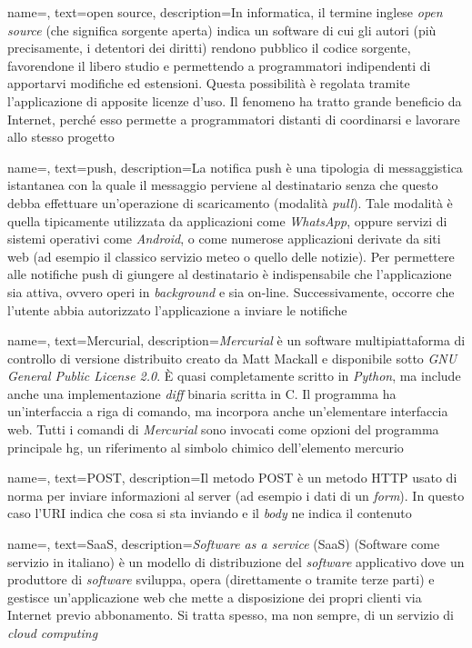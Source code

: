 {
    name=,
    text=open source,
    description={In informatica, il termine inglese \emph{open source} (che significa sorgente aperta) indica un software di cui gli autori (più precisamente, i detentori dei diritti) rendono pubblico il codice sorgente, favorendone il libero studio e permettendo a programmatori indipendenti di apportarvi modifiche ed estensioni. Questa possibilità è regolata tramite l'applicazione di apposite licenze d'uso. Il fenomeno ha tratto grande beneficio da Internet, perché esso permette a programmatori distanti di coordinarsi e lavorare allo stesso progetto}
}

{
    name=,
    text=push,
    description={La notifica push è una tipologia di messaggistica istantanea con la quale il messaggio perviene al destinatario senza che questo debba effettuare un'operazione di scaricamento (modalità \emph{pull}). Tale modalità è quella tipicamente utilizzata da applicazioni come \emph{WhatsApp}, oppure servizi di sistemi operativi come \emph{Android}, o come numerose applicazioni derivate da siti web (ad esempio il classico servizio meteo o quello delle notizie).
Per permettere alle notifiche push di giungere al destinatario è indispensabile che l'applicazione sia attiva, ovvero operi in \emph{background} e sia on-line. Successivamente, occorre che l'utente abbia autorizzato l'applicazione a inviare le notifiche}
}

{
    name=,
    text=Mercurial,
    description={\emph{Mercurial} è un software multipiattaforma di controllo di versione distribuito creato da Matt Mackall e disponibile sotto \emph{GNU General Public License 2.0}.
È quasi completamente scritto in \emph{Python}, ma include anche una implementazione \emph{diff} binaria scritta in C. Il programma ha un'interfaccia a riga di comando, ma incorpora anche un'elementare interfaccia web. 
Tutti i comandi di \emph{Mercurial} sono invocati come opzioni del programma principale hg, un riferimento al simbolo chimico dell'elemento mercurio}
}

{
    name=,
    text=POST,
    description={Il metodo POST è un metodo HTTP usato di norma per inviare informazioni
al server (ad esempio i dati di un \emph{form}). In questo caso l’URI indica che cosa si
sta inviando e il \emph{body} ne indica il contenuto}
}

{
    name=,
    text=SaaS,
    description={\emph{Software as a service} (SaaS) (Software come servizio in italiano) è un modello di distribuzione del \emph{software} applicativo dove un produttore di \emph{software} sviluppa, opera (direttamente o tramite terze parti) e gestisce un'applicazione web che mette a disposizione dei propri clienti via Internet previo abbonamento. Si tratta spesso, ma non sempre, di un servizio di \emph{cloud computing}}
}

